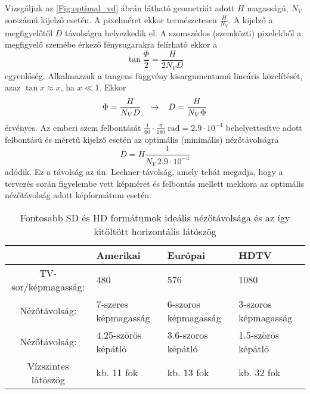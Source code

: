 Vizsgáljuk az \ref{Fig:optimal_vd} ábrán látható geometriát adott $H$ magasságú, $N_V$ sorszámú kijelző esetén.
A pixelméret ekkor természetesen $\frac{H}{N_V}$.
A kijelző a megfigyelőtől $D$ távolságra helyezkedik el.
A szomszédos (szemközti) pixelekből a megfigyelő szemébe érkező fénysugarakra felírható ekkor a 
\begin{equation}
\tan \frac{\Phi}{2} = \frac{H}{2 N_V D}
\end{equation}
egyenlőség.
Alkalmazzuk a tangens függvény kisargumentumú lineáris közelítését, azaz $\tan x \approx x$, ha $x \ll 1$.
Ekkor
\begin{equation}
\Phi = \frac{H}{N_V D} \hspace{3mm} \rightarrow \hspace{3mm} D = \frac{H}{N_V \Phi}
\end{equation}
érvényes.
Az emberi szem felbontását $\frac{1}{60}\cdot \frac{\pi}{180}~\mathrm{rad} = 2.9 \cdot 10^{-4}$ behelyettesítve adott felbontású és méretű kijelző esetén az optimális (minimális) nézőtávolságra
\begin{equation}
D = H \frac{1}{N_V \,  2.9 \cdot 10^{-4}}
\end{equation}
adódik. 
Ez a távolság az ún. Lechner-távolság, amely tehát megadja, hogy a tervezés során figyelembe vett képméret és felbontás mellett mekkora az optimális nézőtávolság adott képformátum esetén.
\begin{table}[h!]
\caption{Fontosabb SD és HD formátumok ideális nézőtávolsága és az így kitöltött horizontális látószög}
\renewcommand*{\arraystretch}{2.25}
\label{tab:viewing_dist}
\begin{center}
    \begin{tabular}[h!]{ @{}c | | l | l | l @{} }%
				         &   Amerikai 		   & Európai 				&	 HDTV \\ \hline
    TV-sor/képmagasság:	 &     480 	  		   &   576   				&	 1080\\
    Nézőtávolság:   &  7-szeres képmagasság    &  6-szoros képmagasság & 3-szoros képmagasság \\
    Nézőtávolság:       &  4.25-szörös képátló &  3.6-szoros képátló	& 1.5-szörös képátló \\
    Vízszintes látószög &  kb. 11 fok 		&    kb. 13 fok & kb. 32 fok\\
    \end{tabular}
\end{center}
\end{table}

